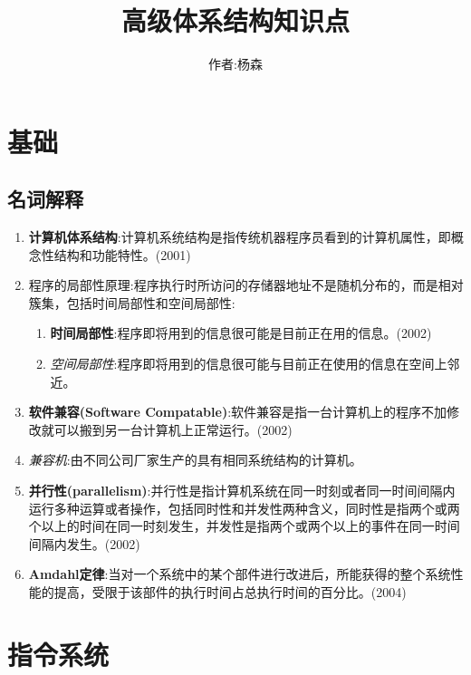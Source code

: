 \documentclass[a4paper]{ctexart}
\begin{document}
\title{高级体系结构知识点}
\author{作者:杨森}
\maketitle


\section{基础}
\subsection{名词解释}
\begin{enumerate}
  \item \textbf{计算机体系结构}:计算机系统结构是指传统机器程序员看到的计算机属性，即概念性结构和功能特性。(2001)
  \item 程序的局部性原理:程序执行时所访问的存储器地址不是随机分布的，而是相对簇集，包括时间局部性和空间局部性:
  \begin{enumerate}
    \item \textbf{时间局部性}:程序即将用到的信息很可能是目前正在用的信息。(2002)
    \item \emph{空间局部性}:程序即将用到的信息很可能与目前正在使用的信息在空间上邻近。
  \end{enumerate}
  \item \textbf{软件兼容(Software Compatable)}:软件兼容是指一台计算机上的程序不加修改就可以搬到另一台计算机上正常运行。(2002)
  \item \emph{兼容机}:由不同公司厂家生产的具有相同系统结构的计算机。
  \item \textbf{并行性(parallelism)}:并行性是指计算机系统在同一时刻或者同一时间间隔内运行多种运算或者操作，包括同时性和并发性两种含义，同时性是指两个或两个以上的时间在同一时刻发生，并发性是指两个或两个以上的事件在同一时间间隔内发生。(2002)
  \item \textbf{Amdahl定律}:当对一个系统中的某个部件进行改进后，所能获得的整个系统性能的提高，受限于该部件的执行时间占总执行时间的百分比。(2004)
  
\end{enumerate}

\section{指令系统}
\end{document}
